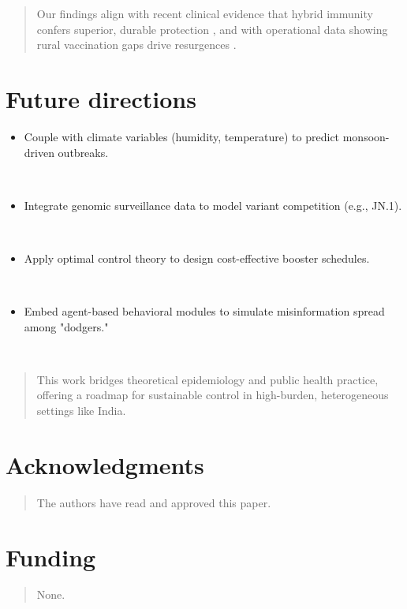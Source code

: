 \documentclass[10pt]{NSP1}
\begin{document}
\begin{quote}
Our findings align with recent clinical evidence that hybrid immunity confers superior, durable protection \cite{ref46,ref47}, and with operational data showing rural vaccination gaps drive resurgences \cite{ref48}.
\end{quote}

\section*{Future directions}

\begin{itemize}
\item
      Couple with climate variables (humidity, temperature) to predict monsoon-driven outbreaks.
  
~
  
\item
  Integrate genomic surveillance data to model variant competition (e.g., JN.1).
  
~
  
\item
  Apply optimal control theory to design cost-effective booster schedules.
  
~
  
\item
  Embed agent-based behavioral modules to simulate misinformation spread among "dodgers."
  
~
  
\end{itemize}

\begin{quote}
This work bridges theoretical epidemiology and public health practice, offering a roadmap for sustainable control in high-burden, heterogeneous settings like India.
\end{quote}

\section*{Acknowledgments}

\begin{quote}
The authors have read and approved this paper.
\end{quote}

\section*{Funding}

\begin{quote}
None.
\end{quote}
\end{document}

